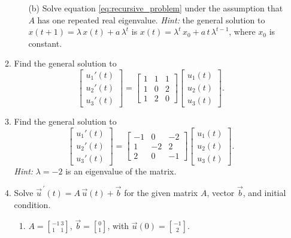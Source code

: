 \documentclass[11pt]{article}
\begin{document}
\begin{enumerate}
\begin{enumerate}
\begin{enumerate}
          \item[(b)] Solve equation \eqref{eq:recursive_problem} under the assumption that $A$ has one repeated real eigenvalue. {\it Hint:} the general solution to $x(t+1) = \lambda\, x(t) + a\, \lambda^t$ is $x(t) = \lambda^t\, x_0 + a\, t \, \lambda^{t-1}$, where $x_0$ is constant.    
        \end{enumerate}
      \item Find the general solution to
        \[
          \begin{bmatrix}
            u_1'(t) \\ u_2'(t) \\ u_3'(t)
          \end{bmatrix}
          =
          \begin{bmatrix}
            1 & 1 & 1 \\
            1 & 0 & 2 \\
            1 & 2 & 0 
          \end{bmatrix}
          \begin{bmatrix}
            u_1(t) \\ u_2(t) \\ u_3(t)
          \end{bmatrix}.
        \]
      \item Find the general solution to 
        \[
          \begin{bmatrix}
            u_1'(t) \\ u_2'(t) \\ u_3'(t)
          \end{bmatrix}
          =
          \begin{bmatrix}
            -1&0&-2\\
            1&-2&2\\ 
            2&0&-1
          \end{bmatrix}
          \begin{bmatrix}
            u_1(t) \\ u_2(t) \\ u_3(t)
          \end{bmatrix}.
        \]
        {\it Hint:} $\lambda = -2$ is an eigenvalue of the matrix. 
      \item Solve $\vec{u}^{\, \prime}(t) = A\, \vec{u}(t) + \vec{b}$ for the given matrix $A$, vector $\vec{b}$, and initial condition.
        \begin{enumerate}
          \item $A={-1 \ 3 \brack 1 \quad 1}$, $\vec{b}={0\brack 1}$, with $\vec{u}(0) = {-1\brack 2}$.

\end{enumerate}
\end{enumerate}
\end{enumerate}
\end{document}

